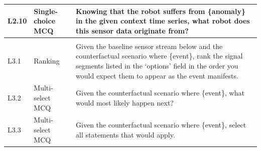 \begin{small}
\begin{longtable}{@{}>{\centering\arraybackslash}p{}>{\raggedright\arraybackslash}p{}>{\raggedright\arraybackslash}p{}@{}}
        L2.10       & Single-choice MCQ      & Knowing that the robot suffers from \{anomaly\} in the given context time series, what robot does this sensor data originate from?                                                                                                                                                                                                                                                                                                                                                                 \\
        \midrule

        \multicolumn{3}{@{}l@{}}{\textbf{Level 3: Counterfactual}}                                                                                                                                                                                                                                                                                                                                                                                                                                                                                \\
        \midrule
        L3.1        & Ranking                & Given the baseline sensor stream below and the counterfactual scenario where \{event\}, rank the signal segments listed in the `options' field in the order you would expect them to appear as the event manifests.                                                                                                                                                                                                                                                                                \\
        L3.2        & Multi-select MCQ       & Given the counterfactual scenario where \{event\}, what would most likely happen next?                                                                                                                                                                                                                                                                                                                                                                                                             \\
        L3.3        & Multi-select MCQ       & Given the counterfactual scenario where \{event\}, select all statements that would apply.                                                                                                                                                                                                                                                                                                                                                                                                         \\

\end{longtable}
\end{small}
